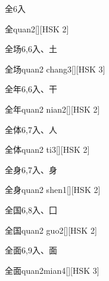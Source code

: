 \begin{entry}{全}{6}{⼊}
  \begin{phonetics}{全}{quan2}[][HSK 2]
  \end{phonetics}
\end{entry}

\begin{entry}{全场}{6,6}{⼊、⼟}
  \begin{phonetics}{全场}{quan2 chang3}[][HSK 3]
  \end{phonetics}
\end{entry}

\begin{entry}{全年}{6,6}{⼊、⼲}
  \begin{phonetics}{全年}{quan2 nian2}[][HSK 2]
  \end{phonetics}
\end{entry}

\begin{entry}{全体}{6,7}{⼊、⼈}
  \begin{phonetics}{全体}{quan2 ti3}[][HSK 2]
  \end{phonetics}
\end{entry}

\begin{entry}{全身}{6,7}{⼊、⾝}
  \begin{phonetics}{全身}{quan2 shen1}[][HSK 2]
  \end{phonetics}
\end{entry}

\begin{entry}{全国}{6,8}{⼊、⼞}
  \begin{phonetics}{全国}{quan2 guo2}[][HSK 2]
  \end{phonetics}
\end{entry}

\begin{entry}{全面}{6,9}{⼊、⾯}
  \begin{phonetics}{全面}{quan2mian4}[][HSK 3]
  \end{phonetics}
\end{entry}

